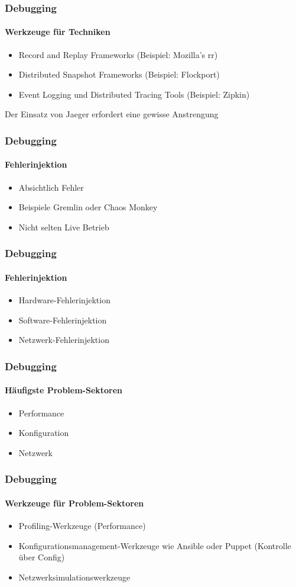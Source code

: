 \begin{frame}
  \frametitle{Debugging}
  \framesubtitle{Werkzeuge für Techniken}
  \begin{itemize}
    \item Record and Replay Frameworks (Beispiel: Mozilla's rr)
    \item Distributed Snapshot Frameworks (Beispiel: Flockport)
    \item Event Logging und Distributed Tracing Tools (Beispiel: Zipkin)
  \end{itemize}
  Der Einsatz von Jaeger erfordert eine gewisse Anstrengung
\end{frame}

\begin{frame}
  \frametitle{Debugging}
  \framesubtitle{Fehlerinjektion}
  \begin{itemize}
    \item Absichtlich Fehler
    \item Beispiele Gremlin oder Chaos Monkey
    \item Nicht selten Live Betrieb
  \end{itemize}
\end{frame}

\begin{frame}
  \frametitle{Debugging}
  \framesubtitle{Fehlerinjektion}
  \begin{itemize}
    \item Hardware-Fehlerinjektion
    \item Software-Fehlerinjektion
    \item Netzwerk-Fehlerinjektion
  \end{itemize}
\end{frame}

\begin{frame}
  \frametitle{Debugging}
  \framesubtitle{Häufigste Problem-Sektoren}
  \begin{itemize}
    \item Performance
    \item Konfiguration
    \item Netzwerk
  \end{itemize}
\end{frame}

\begin{frame}
  \frametitle{Debugging}
  \framesubtitle{Werkzeuge für Problem-Sektoren}
  \begin{itemize}
    \item Profiling-Werkzeuge (Performance)
    \item  Konfigurationsmanagement-Werkzeuge wie Ansible oder Puppet (Kontrolle über Config)
    \item Netzwerksimulationswerkzeuge
  \end{itemize}
\end{frame}